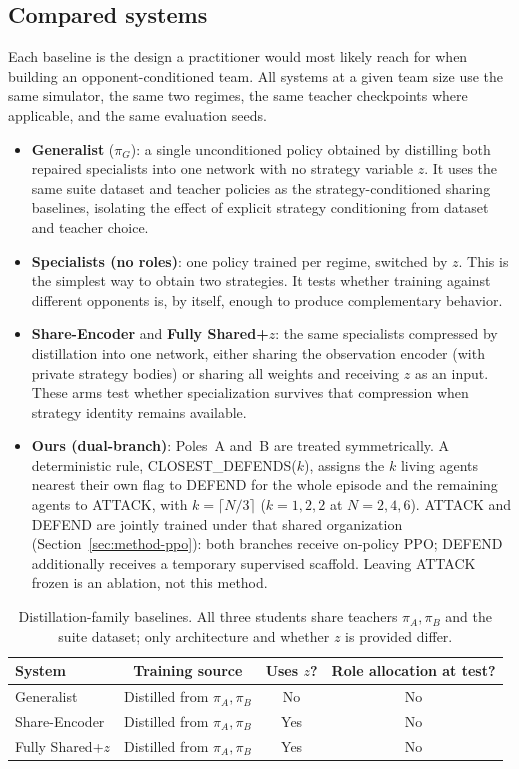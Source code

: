 \subsection{Compared systems}
\label{sec:method-systems}

Each baseline is the design a practitioner would most likely reach for when
building an opponent-conditioned team. All systems at a given team size use
the same simulator, the same two regimes, the same teacher checkpoints where
applicable, and the same evaluation seeds.

\begin{itemize}
  \item \textbf{Generalist} (\(\pi_G\)): a single unconditioned policy obtained
  by distilling both repaired specialists into one network with no strategy
  variable \(z\). It uses the same suite dataset and teacher policies as the
  strategy-conditioned sharing baselines, isolating the effect of explicit
  strategy conditioning from dataset and teacher choice.
  \item \textbf{Specialists (no roles)}: one policy trained per regime,
  switched by \(z\). This is the simplest way to obtain two strategies. It
  tests whether training against different opponents is, by itself, enough to
  produce complementary behavior.
  \item \textbf{Share-Encoder} and \textbf{Fully Shared+\(z\)}: the same
  specialists compressed by distillation into one network, either sharing the
  observation encoder (with private strategy bodies) or sharing all weights
  and receiving \(z\) as an input. These arms test whether specialization
  survives that compression when strategy identity remains available.
  \item \textbf{Ours (dual-branch)}: Poles~A and~B are treated symmetrically.
  A deterministic rule, CLOSEST\_DEFENDS(\(k\)), assigns the \(k\) living
  agents nearest their own flag to DEFEND for the whole episode and the
  remaining agents to ATTACK, with \(k=\lceil N/3\rceil\)
  (\(k=1,2,2\) at \(N=2,4,6\)). ATTACK and DEFEND are jointly trained under
  that shared organization (Section~\ref{sec:method-ppo}): both branches
  receive on-policy PPO; DEFEND additionally receives a temporary supervised
  scaffold. Leaving ATTACK frozen is an ablation, not this method.
\end{itemize}

\begin{table}[t]
\centering
\caption{Distillation-family baselines. All three students share teachers
\(\pi_A,\pi_B\) and the suite dataset; only architecture and whether \(z\) is
provided differ.}
\label{tab:distill-family}
\begin{tabular}{lccc}
\hline
System & Training source & Uses \(z\)? & Role allocation at test? \\
\hline
Generalist & Distilled from \(\pi_A,\pi_B\) & No & No \\
Share-Encoder & Distilled from \(\pi_A,\pi_B\) & Yes & No \\
Fully Shared+\(z\) & Distilled from \(\pi_A,\pi_B\) & Yes & No \\
\hline
\end{tabular}
\end{table}

